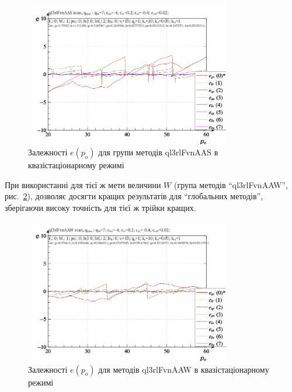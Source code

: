 \begin{figure}[htb!]
  \begin{center}
    \includegraphics[width=0.8\textwidth]{p/scan/qls-p_p_e_ql3rlFvnAAS_scan.png}
  \end{center}
  \caption{Залежності $e(p_o)$ для групи методів ql3rlFvnAAS в квазістаціонарному режимі}
  \label{atu:f:ql3rlFvnAAS_scan}
\end{figure}

При використанні для тієї ж мети величини
$W$ (група методів ``ql3rlFvnAAW'', рис.~\ref{atu:f:ql3rlFvnAAW_scan}), дозволяє
досягти кращих результатів для ``глобальних методів'',
зберігаючи високу точність для тієї ж трійки кращих.


\begin{figure}[htb!]
  \begin{center}
    \includegraphics[width=0.8\textwidth]{p/scan/qls-p_p_e_ql3rlFvnAAW_scan.png}
  \end{center}
  \caption{Залежності $e(p_o)$ для методів ql3rlFvnAAW в квазістаціонарному режимі}
  \label{atu:f:ql3rlFvnAAW_scan}
\end{figure}

